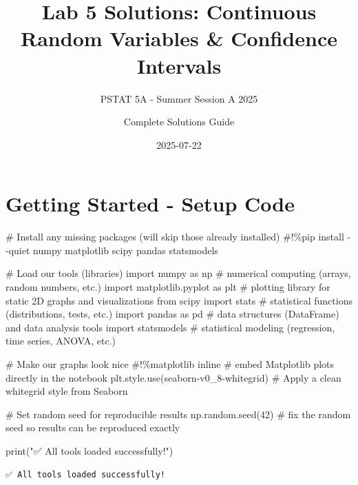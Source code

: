 \documentclass[
  letterpaper,
  DIV=11,
  numbers=noendperiod]{scrartcl}
\title{Lab 5 Solutions: Continuous Random Variables \& Confidence
Intervals}
\subtitle{PSTAT 5A - Summer Session A 2025}
\author{Complete Solutions Guide}
\date{2025-07-22}
\newenvironment{Shaded}{\begin{snugshade}}{\end{snugshade}}
\newcommand{\BuiltInTok}[1]{\textcolor[rgb]{0.00,0.23,0.31}{#1}}
\newcommand{\CommentTok}[1]{\textcolor[rgb]{0.37,0.37,0.37}{#1}}
\newcommand{\DecValTok}[1]{\textcolor[rgb]{0.68,0.00,0.00}{#1}}
\newcommand{\ImportTok}[1]{\textcolor[rgb]{0.00,0.46,0.62}{#1}}
\newcommand{\NormalTok}[1]{\textcolor[rgb]{0.00,0.23,0.31}{#1}}
\newcommand{\StringTok}[1]{\textcolor[rgb]{0.13,0.47,0.30}{#1}}
\renewcommand*\contentsname{Table of contents}
\newcommand\contentsname{Table of contents}
\begin{document}
\maketitle

\renewcommand*\contentsname{Table of contents}
{
\hypersetup{linkcolor=}
\setcounter{tocdepth}{3}
\tableofcontents
}

\section{Getting Started - Setup
Code}\label{getting-started---setup-code}

\begin{Shaded}
\begin{Highlighting}[]
\CommentTok{\# Install any missing packages (will skip those already installed)}
\CommentTok{\#!\%pip install {-}{-}quiet numpy matplotlib scipy pandas statsmodels}

\CommentTok{\# Load our tools (libraries)}
\ImportTok{import}\NormalTok{ numpy }\ImportTok{as}\NormalTok{ np }\CommentTok{\# numerical computing (arrays, random numbers, etc.)}
\ImportTok{import}\NormalTok{ matplotlib.pyplot }\ImportTok{as}\NormalTok{ plt }\CommentTok{\# plotting library for static 2D graphs and visualizations}
\ImportTok{from}\NormalTok{ scipy }\ImportTok{import}\NormalTok{ stats }\CommentTok{\#  statistical functions (distributions, tests, etc.)}
\ImportTok{import}\NormalTok{ pandas }\ImportTok{as}\NormalTok{ pd }\CommentTok{\# data structures (DataFrame) and data analysis tools}
\ImportTok{import}\NormalTok{ statsmodels  }\CommentTok{\# statistical modeling (regression, time series, ANOVA, etc.)}

\CommentTok{\# Make our graphs look nice}
\CommentTok{\#!\%matplotlib inline     \# embed Matplotlib plots directly in the notebook}
\NormalTok{plt.style.use(}\StringTok{\textquotesingle{}seaborn{-}v0\_8{-}whitegrid\textquotesingle{}}\NormalTok{)  }\CommentTok{\# Apply a clean whitegrid style from Seaborn}

\CommentTok{\# Set random seed for reproducible results}
\NormalTok{np.random.seed(}\DecValTok{42}\NormalTok{)    }\CommentTok{\# fix the random seed so results can be reproduced exactly}

\BuiltInTok{print}\NormalTok{(}\StringTok{"✅ All tools loaded successfully!"}\NormalTok{) }
\end{Highlighting}
\end{Shaded}

\begin{verbatim}
✅ All tools loaded successfully!
\end{verbatim}
\end{document}

